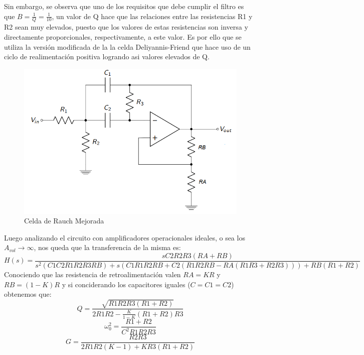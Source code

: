 Sin embargo, se observa que uno de los requisitos que debe cumplir el filtro es que $B = \frac{1}{Q} = \frac{1}{10}$, un valor de Q hace que las relaciones entre las resistencias R1 y R2 sean muy elevados, puesto que los valores de estas resistencias son inversa y directamente proporcionales, respectivamente, a este valor. Es por ello que se utiliza la versión modificada de la la celda Deliyannis-Friend que hace uso de un ciclo de realimentación positiva logrando asi valores elevados de Q.

\begin{figure}[H]
    \centering
    \includegraphics[scale = 0.6]{../Ejercicio2-DisenoDeCeldas/2CELDARAUCH/Informe/circuito.png}
    \caption{Celda de Rauch Mejorada}
    \label{ej22cirbasic}
\end{figure}

Luego analizando el circuito con amplificadores operacionales ideales, o sea los $A_{vol} \longrightarrow \infty$, nos queda que la transferencia de la misma es:
\begin{equation}
    \label{ej22eqh}
    H(s) = \frac{sC2R2R3(RA+RB)}{s^2(C1C2R1R2R3RB) + s(C1R1R2RB + C2(R1R2RB - RA(R1R3 + R2R3))) + RB(R1+R2)}
\end{equation}
Conociendo que las resistencia de retroalimentación valen $RA = KR$ y $RB = (1-K)R$ y si conciderando los capacitores iguales ($C = C1 = C2$) obtenemos que:
\begin{equation}
    \label{ej22eqq}
    Q = \frac{\sqrt{R1R2R3(R1 + R2)}}{2R1R2 - \frac{K}{1 -K} (R1 + R2)R3}
\end{equation}
\begin{equation}
    \label{ej22eqw0}
    \omega_0^2 = \frac{R1+R2}{C^2R1R2R3}
\end{equation}
\begin{equation}
    \label{ej22eqg}
    G = \frac{R2R3}{2R1R2(K - 1) + KR3(R1 + R2)}
\end{equation}


